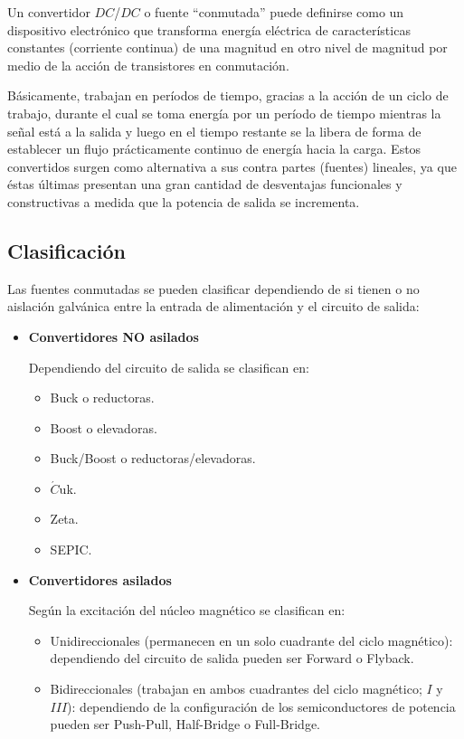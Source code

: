 \documentclass[11pt, a4paper]{article}
\begin{document}
Un convertidor $DC$/$DC$ o fuente “conmutada” puede definirse como un dispositivo electrónico que transforma energía eléctrica de características constantes (corriente continua) de una magnitud en otro nivel de magnitud por medio de la acción de transistores en conmutación.

Básicamente, trabajan en períodos de tiempo, gracias a la acción de un ciclo de trabajo, durante el cual se toma energía por un período de tiempo mientras la señal está a la salida y luego en el tiempo restante se la libera de forma de establecer un flujo prácticamente continuo de energía hacia la carga. Estos convertidos surgen como alternativa a sus contra partes (fuentes) lineales, ya que éstas últimas presentan una gran cantidad de desventajas funcionales y constructivas a medida que la potencia de salida se incrementa.

\subsection{Clasificación}
Las fuentes conmutadas se pueden clasificar dependiendo de si tienen o no aislación galvánica entre la entrada de alimentación y el circuito de salida:
\begin{itemize} 
	\item \textbf{Convertidores NO asilados}
	
	Dependiendo del circuito de salida se clasifican en:
		\begin{itemize}
			\item Buck o reductoras.
			\item Boost o elevadoras.
			\item Buck/Boost o reductoras/elevadoras.
			\item $\acute{C}$uk.
			\item Zeta.
			\item SEPIC.
		\end{itemize}
	\item \textbf{Convertidores asilados}
	
	Según la excitación del núcleo magnético se clasifican en:
		\begin{itemize}
			\item Unidireccionales (permanecen en un solo cuadrante del ciclo magnético): dependiendo del circuito de salida pueden ser Forward o Flyback.
			\item Bidireccionales (trabajan en ambos cuadrantes del ciclo magnético; $I$ y $III$): dependiendo de la configuración de los semiconductores de potencia pueden ser Push-Pull, Half-Bridge o Full-Bridge.
		\end{itemize}
\end{itemize}
\end{document}
